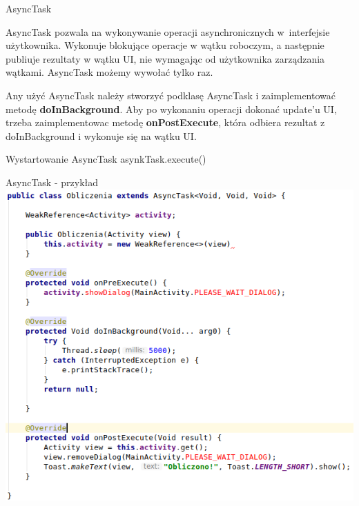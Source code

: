 \documentclass{beamer}
\begin{document}
\begin{frame}{AsyncTask}
	\begin{block}{}
		AsyncTask pozwala na wykonywanie operacji asynchronicznych w~interfejsie użytkownika. Wykonuje blokujące operacje w wątku roboczym, a następnie publiuje rezultaty w wątku UI, nie wymagając od użytkownika zarządzania wątkami. AsyncTask możemy wywołać tylko raz.
	\end{block}
	
	\begin{block}{}
		Any użyć AsyncTask należy stworzyć podklasę AsyncTask i zaimplementować metodę \textbf{doInBackground}. Aby po wykonaniu operacji dokonać update'u UI, trzeba zaimplementowac metodę \textbf{onPostExecute}, która odbiera rezultat z doInBackground i wykonuje się na wątku UI.
	\end{block}
	
	\begin{block}{Wystartowanie AsyncTask}
		asynkTask.execute()
	\end{block}
\end{frame}

\begin{frame}{AsyncTask - przykład}
	\centering
	\includegraphics[height=0.8\textheight]{asynctask}
\end{frame}
\end{document}
